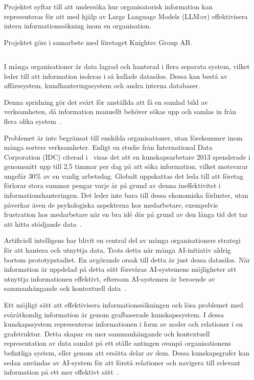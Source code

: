 \section{}\label{sec:intro}
Projektet syftar till att undersöka hur organisatorisk information kan representeras för att med hjälp av Large Language Models (LLM:er) effektivisera intern informationssökning inom en organisation.

Projektet görs i samarbete med företaget Knightec Group AB.
\subsection{}\label{subsec:background}
\noindent 
I många organisationer är data lagrad och hanterad i flera separata system, 
vilket leder till att information isoleras i så kallade datasilos. 
Dessa kan bestå av affärssystem, kundhanteringssystem och andra interna databaser.

Denna spridning gör det svårt för anställda att få en samlad bild av verksamheten, då information manuellt behöver sökas upp och samlas in
från flera olika system~\cite{2}.

Problemet är inte begränsat till enskilda organisationer, utan förekommer inom många sorters verksamheter.
Enligt en studie från International Data Corporation (IDC) citerad i~\cite{armedia} visas det att en kunskapsarbetare 2013 spenderade i genomsnitt upp till 2,5 timmar per dag på att söka information, vilket motsvarar ungefär 30\% av en vanlig arbetsdag.
Globalt uppskattas det leda till att företag förlorar stora summor pengar varje år på grund av denna ineffektivitet i informationshanteringen. Det leder inte bara till dessa ekonomiska förluster,
utan påverkar även de psykologiska aspekterna hos medarbetare, exempelvis frustration hos medarbetare när en bra idé dör på grund av den långa tid det tar att hitta stödjande data~\cite{2}.

Artificiell intelligens har blivit en central del av många organisationers strategi för att hantera och utnyttja data.
Trots detta når många AI-initiativ aldrig bortom prototypstadiet. En avgörande orsak till detta är just dessa datasilos.
När information är uppdelad på detta sätt försvåras AI-systemens möjligheter att utnyttja informationen effektivt, eftersom AI-systemen är beroende av sammanhängande och kontextuell data~\cite{3}.

Ett möjligt sätt att effektivisera informationssökningen och lösa problemet med svåråtkomlig information är genom grafbaserade kunskapssystem. I dessa kunskapssystem representeras informationen i form av noder och relationer i en grafstruktur.
Detta skapar en mer sammanhängande och kontextuell representation av data samlat på ett ställe antingen ovanpå organisationens befintliga system, eller genom att ersätta delar av dem.
Dessa kunskapsgrafer kan sedan användas av AI-system för att förstå relationer och navigera till relevant information på ett mer effektivt sätt~\cite{1}.


